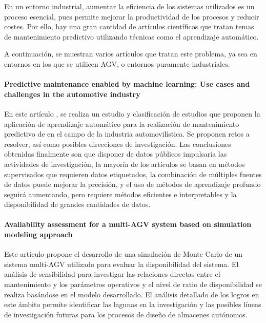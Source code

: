 
En un entorno industrial, aumentar la eficiencia de los sistemas utilizados es un proceso esencial, pues permite 
mejorar la productividad de los procesos y reducir costes. Por ello, hay una gran cantidad de artículos científicos 
que tratan temas de mantenimiento predictivo utilizando técnicas como el aprendizaje automático.

A continuación, se muestran varios artículos que tratan este problema, ya sea en entornos en los que se utilicen
AGV, o entornos puramente industriales.
\paragraph{Predictive maintenance enabled by machine learning: Use cases and challenges in the automotive industry}
En este artículo \cite{THEISSLER2021107864}, se realiza un estudio y clasificación de estudios que proponen la aplicación de aprendizaje 
automático para la realización de mantenimiento predictivo de en el campo de la industria automovilística.
Se proponen retos a resolver, así como posibles direcciones de investigación. Las conclusiones obtenidas finalmente 
son que disponer de datos públicos impulsaría las actividades de investigación, la mayoría de los artículos se basan 
en métodos supervisados que requieren datos etiquetados, la combinación de múltiples fuentes de datos puede 
mejorar la precisión, y el uso de métodos de aprendizaje profundo seguirá aumentando, pero requiere métodos 
eficientes e interpretables y la disponibilidad de grandes cantidades de datos.

\paragraph{Availability assessment for a multi-AGV system based on simulation modeling approach}
Este artículo \cite{9590979} propone el desarrollo de una simulación de Monte Carlo de un sistema multi-AGV 
utilizado para evaluar la disponibilidad del sistema. El análisis de sensibilidad para investigar las relaciones 
directas entre el mantenimiento y los parámetros operativos y el nivel de ratio de disponibilidad se 
realiza basándose en el modelo desarrollado. El análisis detallado de los logros en este ámbito permite 
identificar las lagunas en la investigación y las posibles líneas de investigación futuras para los 
procesos de diseño de almacenes autónomos.

